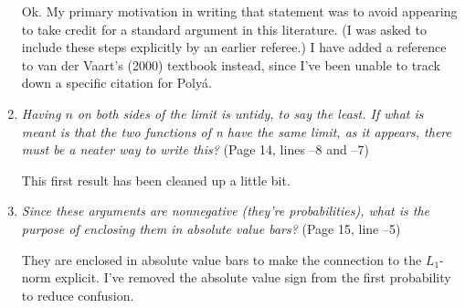 \documentclass[12pt]{article}
\begin{document}
\begin{enumerate}
  Ok. My primary motivation in writing that statement was to avoid
  appearing to take credit for a standard argument in this
  literature. (I was asked to include these steps explicitly by an
  earlier referee.)  I have added a reference to van der Vaart's
  (2000) textbook instead, since I've been unable to track down a
  specific citation for Poly\'a.


\item \emph{Having $n$ on both sides of the limit is untidy, to say
    the least. If what is meant is that the two functions of n have
    the same limit, as it appears, there must be a neater way to write
    this?} (Page 14, lines --8 and --7)

  This first result has been cleaned up a little bit.

\item \emph{Since these arguments are nonnegative (they're
    probabilities), what is the purpose of enclosing them in absolute
    value bars?} (Page 15, line --5)

  They are enclosed in absolute value bars to make the connection to the
  $L_{1}$-norm explicit. I've removed the absolute value sign from the first
  probability to reduce confusion.

\end{enumerate}
\end{document}
